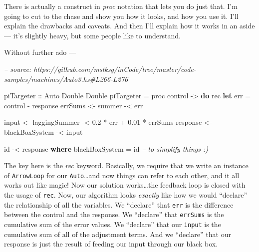 \documentclass[]{article}
\newenvironment{Shaded}{}{}
\newcommand{\CommentTok}[1]{\textcolor[rgb]{0.38,0.63,0.69}{\textit{#1}}}
\newcommand{\DataTypeTok}[1]{\textcolor[rgb]{0.56,0.13,0.00}{#1}}
\newcommand{\FloatTok}[1]{\textcolor[rgb]{0.25,0.63,0.44}{#1}}
\newcommand{\FunctionTok}[1]{\textcolor[rgb]{0.02,0.16,0.49}{#1}}
\newcommand{\KeywordTok}[1]{\textcolor[rgb]{0.00,0.44,0.13}{\textbf{#1}}}
\newcommand{\NormalTok}[1]{#1}
\newcommand{\OtherTok}[1]{\textcolor[rgb]{0.00,0.44,0.13}{#1}}
\begin{document}
There is actually a construct in \emph{proc} notation that lets you do just
that. I'm going to cut to the chase and show you how it looks, and how you use
it. I'll explain the drawbacks and caveats. And then I'll explain how it works
in an aside --- it's slightly heavy, but some people like to understand.

Without further ado ---

\begin{Shaded}
\begin{Highlighting}[]
\CommentTok{-- source: https://github.com/mstksg/inCode/tree/master/code-samples/machines/Auto3.hs#L266-L276}

\OtherTok{piTargeter ::} \DataTypeTok{Auto} \DataTypeTok{Double} \DataTypeTok{Double}
\NormalTok{piTargeter }\FunctionTok{=}\NormalTok{ proc control }\OtherTok{->} \KeywordTok{do}
\NormalTok{    rec }\KeywordTok{let}\NormalTok{ err }\FunctionTok{=}\NormalTok{ control }\FunctionTok{-}\NormalTok{ response}
\NormalTok{        errSums  }\OtherTok{<-}\NormalTok{ summer         }\FunctionTok{-<}\NormalTok{ err}

\NormalTok{        input    }\OtherTok{<-}\NormalTok{ laggingSummer  }\FunctionTok{-<} \FloatTok{0.2} \FunctionTok{*}\NormalTok{ err }\FunctionTok{+} \FloatTok{0.01} \FunctionTok{*}\NormalTok{ errSums}
\NormalTok{        response }\OtherTok{<-}\NormalTok{ blackBoxSystem }\FunctionTok{-<}\NormalTok{ input}

\NormalTok{    id }\FunctionTok{-<}\NormalTok{ response}
  \KeywordTok{where}
\NormalTok{    blackBoxSystem }\FunctionTok{=}\NormalTok{ id     }\CommentTok{-- to simplify things :)}
\end{Highlighting}
\end{Shaded}

The key here is the \emph{rec} keyword. Basically, we require that we write an
instance of \texttt{ArrowLoop} for our \texttt{Auto}\ldots{}and now things can
refer to each other, and it all works out like magic! Now our solution
works\ldots{}the feedback loop is closed with the usage of \texttt{rec}. Now,
our algorithm looks \emph{exactly} like how we would ``declare'' the
relationship of all the variables. We ``declare'' that \texttt{err} is the
difference between the control and the response. We ``declare'' that
\texttt{errSums} is the cumulative sum of the error values. We ``declare'' that
our \texttt{input} is the cumulative sum of all of the adjustment terms. And we
``declare'' that our response is just the result of feeding our input through
our black box.
\end{document}
